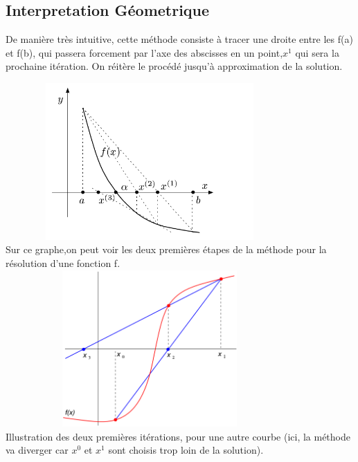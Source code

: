 \documentclass{article}
\begin{document}
\subsection{Interpretation Géometrique}
De manière très intuitive, cette méthode consiste à tracer une droite entre les f(a) et f(b), qui passera forcement par l'axe des abscisses en un point,$x^1$ qui sera la prochaine itération. On réitère le procédé jusqu'à approximation de la solution. 

\includegraphics[width=11cm,height=6cm]{img/interpretation/cordes2.png}\\
Sur ce graphe,on peut voir les deux premières étapes de la méthode pour la résolution d'une fonction f. \\

\includegraphics[width=11cm,height=6cm]{img/interpretation/cordes.png}\\
Illustration des deux premières itérations, pour une autre courbe (ici, la méthode va diverger car $x^0$ et $x^1$ sont choisis trop loin de la solution).
\end{document}
